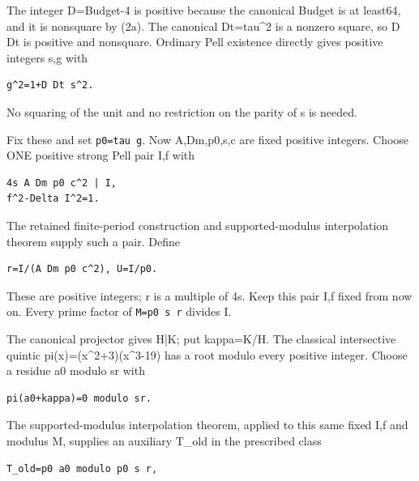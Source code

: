 The integer D=\allowbreak{}Budget-4 is positive because the canonical Budget is at least64, and it is nonsquare by (2a). The canonical Dt=\allowbreak{}tau\textasciicircum{}\allowbreak{}2 is a nonzero square, so D Dt is positive and nonsquare. Ordinary Pell existence directly gives positive integers s,g with



\begin{verbatim}
g^2=1+D Dt s^2.
\end{verbatim}

No squaring of the unit and no restriction on the parity of s is needed.



Fix these and set \texttt{p0=\allowbreak{}tau g}. Now A,Dm,p0,s,c are fixed positive integers. Choose ONE positive strong Pell pair I,f with



\begin{verbatim}
4s A Dm p0 c^2 | I,
f^2-Delta I^2=1.
\end{verbatim}

The retained finite-period construction and supported-modulus interpolation theorem supply such a pair. Define



\begin{verbatim}
r=I/(A Dm p0 c^2), U=I/p0.
\end{verbatim}

These are positive integers; r is a multiple of 4s. Keep this pair I,f fixed from now on. Every prime factor of \texttt{M=\allowbreak{}p0 s r} divides I.



The canonical projector gives H|K; put kappa=\allowbreak{}K/\allowbreak{}H. The classical intersective quintic pi(x)=\allowbreak{}(x\textasciicircum{}\allowbreak{}2+\allowbreak{}3)(x\textasciicircum{}\allowbreak{}3-19) has a root modulo every positive integer. Choose a residue a0 modulo sr with



\begin{verbatim}
pi(a0+kappa)=0 modulo sr.
\end{verbatim}

The supported-modulus interpolation theorem, applied to this same fixed I,f and modulus M, supplies an auxiliary T\_\allowbreak{}old in the prescribed class



\begin{verbatim}
T_old=p0 a0 modulo p0 s r,
\end{verbatim}

